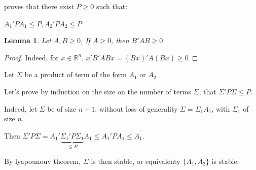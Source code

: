 \documentclass[11pt]{article}
\newtheorem{lemma}[theorem]{Lemma}
\newtheorem{proof}[theorem]{Proof}
\begin{document}
proves that there exist \(P \ge 0\)  such that:

\(A_1' P A_1 \le P, A_2' P A_2 \le P\)


\begin{lemma}
Let \(A, B \ge 0\), If \(A \ge 0\), then \(B'AB \ge 0\)
\end{lemma}


\begin{proof}
Indeed, for \(x \in \mathbb R^n\), \(x'B'ABx = (Bx)' A (Bx) \ge 0\)
\end{proof}

Let \(\Sigma\) be a product of term of the form \(A_1\) or \(A_2\)

Let's prove by induction on the size on the number of terms \(\Sigma\), that \(\Sigma' P \Sigma \le P\).

Indeed, let \(\Sigma\) be of size \(n+1\), without loss of generality \(\Sigma = \Sigma_1 A_1\), with \(\Sigma_1\) of size \(n\).

Then \(\Sigma' P \Sigma = A_1' \underbrace{\Sigma_1' P \Sigma_1}_{\le P} A_1 \le A_1' P A_1 \le A_1\).

By lyapounouv theorem, \(\Sigma\) is then stable, or equivalenty \(\{A_1, A_2\}\) is stable.
\end{document}
